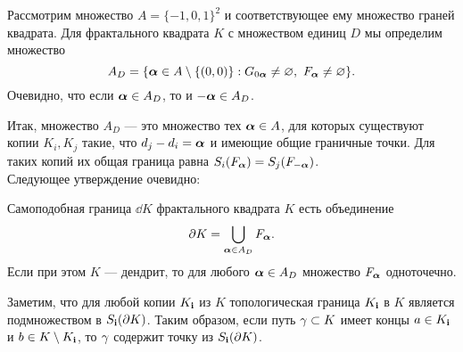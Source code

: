 Рассмотрим множество $A=\{-1,0,1\}^2$ и соответствующее ему множество граней квадрата. 
Для фрактального квадрата $K$ с множеством единиц $D$ мы определим множество 
$$A_D=\{{\bm{\alpha}}\in A\setminus\{(0,0)\}: G_{0{\bm{\alpha}}}\neq\varnothing,\ F_{\bm{\alpha}}\neq\varnothing\}.$$ 
Очевидно, что если ${\bm{\alpha}}\in A_D$, то и $-{\bm{\alpha}}\in A_D$.

Итак, множество $A_D$ --- это множество тех ${\bm{\alpha}}\in A$, для которых существуют копии $K_i, K_j$ такие, что $d_j-d_i={\bm{\alpha}}$ и имеющие общие граничные точки. 
Для таких копий их общая граница равна $S_i(F_{\bm{\alpha}})=S_j(F_{-{\bm{\alpha}}})$.\\

Следующее утверждение очевидно:

\begin{proposition}\label{prop:dd}
Самоподобная граница $\dd K$ фрактального квадрата $K$ есть объединение
$$\partial K=\bigcup\limits_{{\bm{\alpha}}\in A_D}F_{\bm{\alpha}}.$$
Если при этом $K$ --- дендрит, то для любого ${\bm{\alpha}}\in A_D$ множество $F_{\bm{\alpha}}$ одноточечно.
\end{proposition}

Заметим, что для любой копии $K_{\bf{i}}$ из $K$ топологическая граница $K_{\bf{i}}$ в $K$ является подмножеством в 
$S_{\bf{i}}(\partial K)$. 
Таким образом, если путь $\gamma\subset K$ имеет концы $a\in K_{\bf{i}}$ и $b\in K\setminus K_{\bf{i}}$, то $\gamma$ содержит точку из $S_{\bf{i}}(\partial K)$.

